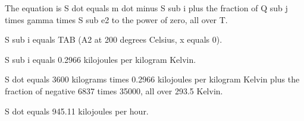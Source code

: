 The equation is S dot equals m dot minus S sub i plus the fraction of Q sub j times gamma times S sub e2 to the power of zero, all over T.

S sub i equals TAB (A2 at 200 degrees Celsius, x equals 0).

S sub i equals 0.2966 kilojoules per kilogram Kelvin.

S dot equals 3600 kilograms times 0.2966 kilojoules per kilogram Kelvin plus the fraction of negative 6837 times 35000, all over 293.5 Kelvin.

S dot equals 945.11 kilojoules per hour.